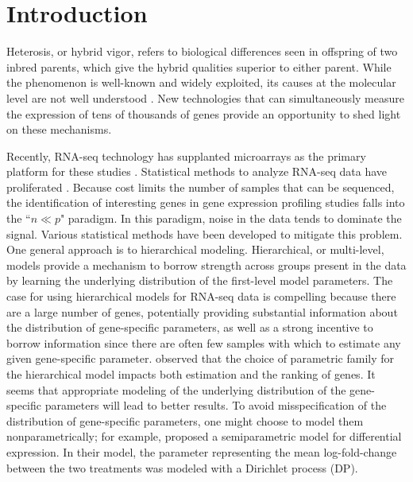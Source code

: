 \section{Introduction}
Heterosis, or hybrid vigor, refers to biological differences seen in offspring of two inbred parents, which give the hybrid qualities superior to either parent. While the phenomenon is well-known and widely exploited, its causes at the molecular level are not well understood \citep{paschold}. New technologies that can simultaneously measure the expression of tens of thousands of genes provide an opportunity to shed light on these mechanisms.

Recently, RNA-seq technology has supplanted microarrays as the primary platform for these studies \citep{wang2009rna}. Statistical methods to analyze RNA-seq data have proliferated \citep{voom,deseq2014,mccarthy,liu,landau}. Because cost limits the number of samples that can be sequenced, the identification of interesting genes in gene expression profiling studies falls into the ``$n \ll p$" paradigm. In this paradigm, noise in the data tends to dominate the signal. Various statistical methods have been developed to mitigate this problem. One general approach is to hierarchical modeling. Hierarchical, or multi-level, models provide a mechanism to borrow strength across groups present in the data by learning the underlying distribution of the first-level model parameters. The case for using hierarchical models for RNA-seq data is compelling because there are a large number of genes, potentially providing substantial information about the distribution of gene-specific parameters, as well as a strong incentive to borrow information since there are often few samples with which to estimate any given gene-specific parameter. \citet{niemi} observed that the choice of parametric family for the hierarchical model impacts both estimation and the ranking of genes. It seems that appropriate modeling of the underlying distribution of the gene-specific parameters will lead to better results. To avoid misspecification of the distribution of gene-specific parameters, one might choose to model them nonparametrically; for example, \citet{liu} proposed a semiparametric model for differential expression. In their model, the parameter representing the mean log-fold-change between the two treatments was modeled with a Dirichlet process (DP).

